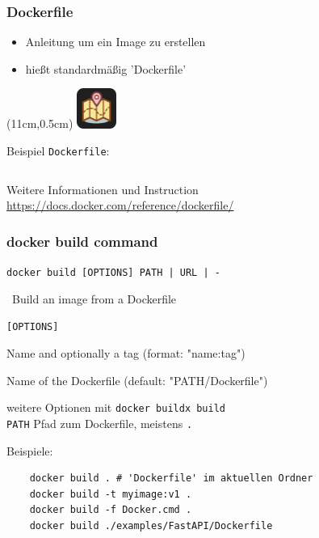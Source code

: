 \documentclass[22pt]{beamer}
\newcommand{\code}[1]{\colorbox{gray!10}{\texttt{#1}}}
\newcommand{\desclabel}[1]{\textcolor{cyan}{#1}}
\newcommand{\codeTour}{
    \begin{textblock*}{1.3cm}(11cm,0.5cm) %
    \includegraphics[width=1.3cm]{Bilder/CodeTour.png}
    \end{textblock*}
}
\begin{document}
\begin{frame}[fragile]
    \frametitle{Dockerfile}
    \begin{itemize}
        \item Anleitung um ein Image zu erstellen
        \item hießt standardmäßig 'Dockerfile'
    \end{itemize}
    \codeTour

    Beispiel \code{Dockerfile}: 
    \inputminted[fontsize=\footnotesize, frame=lines]{Dockerfile}{../examples/Dockerfile}\medskip 
    \pause
    \pause
    Weitere Informationen und Instruction
    \href{https://docs.docker.com/reference/dockerfile/#overview}{https://docs.docker.com/reference/dockerfile/}


\end{frame}

\begin{frame}[fragile]
    \frametitle{docker build command}
    \code{docker build [OPTIONS] PATH | URL | -} 
    
    \-  \ Build an image from a Dockerfile

    \code{[OPTIONS]}
    \begin{description}[labelindent=0.5cm, style=unboxed, labelwidth=\widthof{-f, --file string}, leftmargin=!]
        \item[\desclabel{-t, --tag stringArray}] Name and optionally a tag (format: "name:tag")
        \item[\desclabel{-f, --file string}] Name of the Dockerfile (default: "PATH/Dockerfile")
    \end{description}
    {\small weitere Optionen mit \code{docker buildx build}}\\
    \code{PATH} Pfad zum Dockerfile, meistens \code{.}


    Beispiele: %
    \begin{verbatim}
    docker build . # 'Dockerfile' im aktuellen Ordner
    docker build -t myimage:v1 . 
    docker build -f Docker.cmd . 
    docker build ./examples/FastAPI/Dockerfile
    \end{verbatim}
    
\end{frame}
\end{document}
